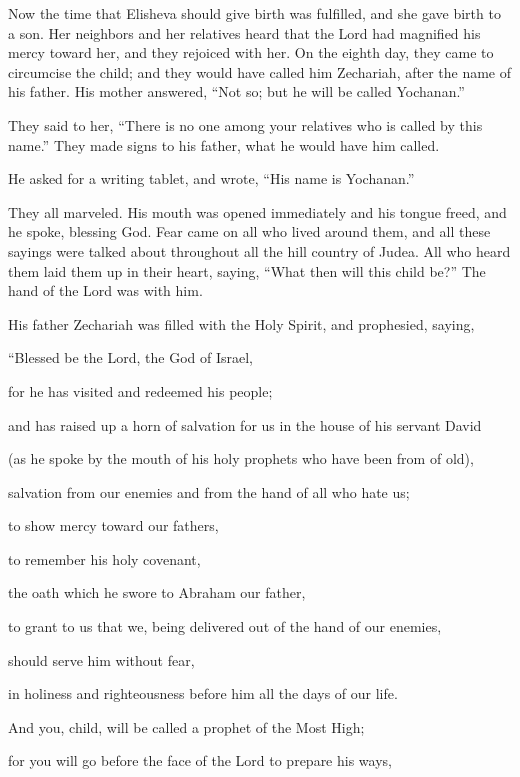 \myverse{}Now the time that Elisheva should give birth was fulfilled, and
she gave birth to a son.
\myverse{}Her neighbors and her relatives heard that the Lord had magnified his mercy
toward her, and they rejoiced with her.
\myverse{}On the eighth day, they came to circumcise the child; and they would have
called him Zechariah, after the name of his father.
\myverse{}His mother answered, “Not so; but he will be called Yochanan.”

\myverse{}They said to her, “There is no one among your relatives who is
called by this name.”
\myverse{}They made signs to his father, what he would have him called.

\myverse{}He asked for a writing tablet, and wrote, “His name is Yochanan.”

They all marveled.
\myverse{}His mouth was opened immediately and his tongue freed, and he spoke, blessing
God.
\myverse{}Fear came on all who lived around them, and all these sayings were talked
about throughout all the hill country of Judea.
\myverse{}All who heard them laid them up in their heart, saying, “What then will this
child be?” The hand of the Lord was with him.

\myverse{}His father Zechariah was filled with the Holy Spirit, and prophesied,
saying,

\myverse{}“Blessed be the Lord, the God of Israel,

for he has visited and redeemed his people;

\myverse{}and has raised up a horn of salvation for us in the house of
his servant David

\myverse{}(as he spoke by the mouth of his holy prophets who
have been from of old),

\myverse{}salvation from our enemies and from the hand of all
who hate us;

\myverse{}to show mercy toward our fathers,

to remember his holy covenant,

\myverse{}the oath which he swore to Abraham our father,

\myverse{}to grant to us that we, being delivered out of the
hand of our enemies,

should serve him without fear,

\myverse{}in holiness and righteousness before him all the days
of our life.

\myverse{}And you, child, will be called a prophet of the Most High;

for you will go before the face of the Lord to prepare his ways,

